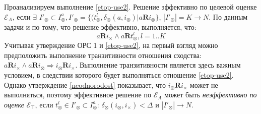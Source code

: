 Проанализируем выполнение \ref{etop-use2}. Решение эффективно по целевой оценке $\mathcal{E}_A$, если 
$\exists$ $I'_{\otimes} \subset I^a_{\otimes}, I'_{\otimes} = \{ (t^l_{\otimes}, \delta_{\otimes}(a, i_{\otimes}) |  a \mathbf{R} i_{\otimes} \}$, $|I'_{\otimes}| = K \rightarrow N$.
По данным задачи и по тому, что решение эффективно, выполняется, что:
\begin{equation}
 a \mathbf{R} i_{\times} \wedge a \mathbf{R} t^l_{\otimes}, l = 1..K
\end{equation}
Учитывая утверждение ОРС 1 и \ref{etop-use2}, на первый взгляд можно предположить выполнение транзитивности отношения сходства:
$a \mathbf{R} i_{\times} \wedge a \mathbf{R} i_{\otimes}  \Rightarrow i_{\otimes} \mathbf{R} i_{\times}$.
Выполнение транзитивности является здесь важным условием, в следствии которого будет выполняться отношение \ref{etop-use2}.
Однако утверждение \ref{neodnorodost} показывает, что $i_{\otimes} \mathbf{R} i_{\times}$ может не выполняться, поэтому эффективное решение по $\mathcal{E}_A$ 
может быть {\it неэффективно по оценке} $\mathcal{E}_{\top}$, если 
$t^l_{\otimes} \in I'_{\otimes} \subset I^a_{\otimes}$: $\delta_{\otimes}(i_{\otimes}, i_{\times}) < \Delta$ и $|I'_{\otimes}| \rightarrow N$.

